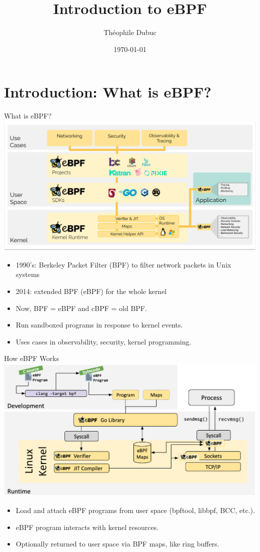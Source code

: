 \documentclass{beamer}
\title{Introduction to eBPF}
\author{Théophile Dubuc}
\date{\today}
\begin{document}
\frame{\titlepage}

\section{Introduction: What is eBPF?}
\begin{frame}{What is eBPF?}
    \centering
    \includegraphics[width=0.8\linewidth]{figures/ebpf-overview.png}
    \begin{itemize}
        \item 1990's: Berkeley Packet Filter (BPF) to filter network packets in
            Unix systems
        \item 2014: extended BPF (eBPF) for the whole kernel
        \item Now, BPF = eBPF and cBPF = old BPF.
        \item Run sandboxed programs in response to kernel events.
        \item Uses cases in observability, security, kernel programming.
    \end{itemize}
\end{frame}

\begin{frame}{How eBPF Works}
    \centering
    \includegraphics[width=0.8\linewidth]{figures/ebpf-loader.png}
    \begin{itemize}
        \item Load and attach eBPF programs from user space (bpftool, libbpf,
            BCC, etc.).
        \item eBPF program interacts with kernel resources.
        \item Optionally returned to user space via BPF maps, like ring buffers.
    \end{itemize}
\end{frame}
\end{document}
